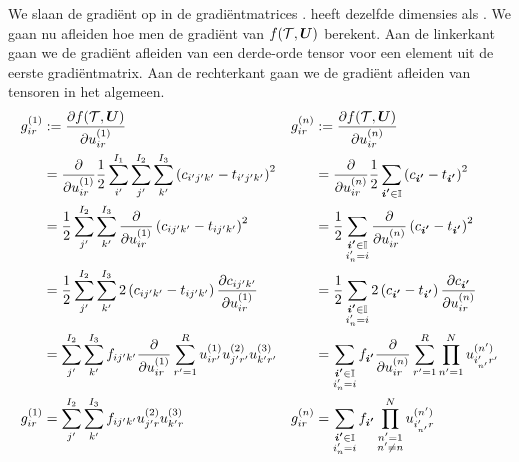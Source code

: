 We slaan de gradi\"ent op in de gradi\"entmatrices \GGG{}. \GGG{} heeft dezelfde dimensies als \UUU{}. We gaan nu afleiden hoe men de gradi\"ent van $f(\mathcal{T}, \boldsymbol{U})$ berekent. Aan de linkerkant gaan we de gradi\"ent afleiden van een derde-orde tensor voor een element uit de eerste gradi\"entmatrix. Aan de rechterkant gaan we de gradi\"ent afleiden van tensoren in het algemeen.
\begin{align*}
	g^{(1)}_{ir} 	&:= \frac{\partial f(\T, \mUUU)}{\partial u^{(1)}_{ir}} &
    g^{(n)}_{ir} 	&:= \frac{\partial f(\T, \mUUU)}{\partial u^{(n)}_{ir}}\\
%    
					&=\frac{\partial}{\partial u^{(1)}_{ir}} \frac{1}{2}\sum_{i'}^{I_1}\sum_{j'}^{I_2}\sum_{k'}^{I_3}\left(c_{i'j'k'} - t_{i'j'k'} \right)^2 &
					&=\frac{\partial}{\partial u^{(n)}_{ir}} \frac{1}{2}\sum_{\iii{} \in \I}\left(c_{\iii{}} - t_{\iii{}} \right)^2\\
%					
					&= \frac{1}{2} \sum_{j'}^{I_2}\sum_{k'}^{I_3} \frac{\partial}{\partial u^{(1)}_{ir}} \left(c_{ij'k'} - t_{ij'k'} \right)^2 &
					&= \frac{1}{2} \sum_{\substack{\iii{} \in \I\\ i'_n = i}} \frac{\partial}{\partial u^{(n)}_{ir}} \left(c_{\iii{}} - t_{\iii{}} \right)^2\\
%					
					&= \frac{1}{2} \sum_{j'}^{I_2}\sum_{k'}^{I_3} 2 \left(c_{ij'k'} - t_{ij'k'} \right) \frac{\partial c_{ij'k'}}{\partial u^{(1)}_{ir}} &
					&= \frac{1}{2} \sum_{\substack{\iii{} \in \I\\ i'_n = i}} 2 \left(c_{\iii{}} - t_{\iii{}} \right) \frac{\partial c_{\iii{}}}{\partial u^{(n)}_{ir}}\\
%					
					&=\sum_{j'}^{I_2}\sum_{k'}^{I_3} f_{ij'k'} \frac{\partial}{\partial u^{(1)}_{ir}} \sum_{r'=1}^{R}  u^{(1)}_{ir'} u^{(2)}_{j'r'} u^{(3)}_{k'r'}&
					&=\sum_{\substack{\iii{} \in \I\\ i'_n = i}} f_{\iii{}} \frac{\partial}{\partial u^{(n)}_{ir}} \sum_{r'=1}^{R} \prod_{n'=1}^{N} u^{(n')}_{i'_{n'}r'}\\
%					
	g^{(1)}_{ir}	&=\sum_{j'}^{I_2}\sum_{k'}^{I_3} f_{ij'k'} u^{(2)}_{j'r} u^{(3)}_{k'r}&
	g^{(n)}_{ir}	&=\sum_{\substack{\iii{} \in \I\\ i'_n = i}} f_{\iii{}} \prod_{\substack{n'=1\\n'\neq n}}^{N} u^{(n')}_{i'_{n'}r}
\end{align*}